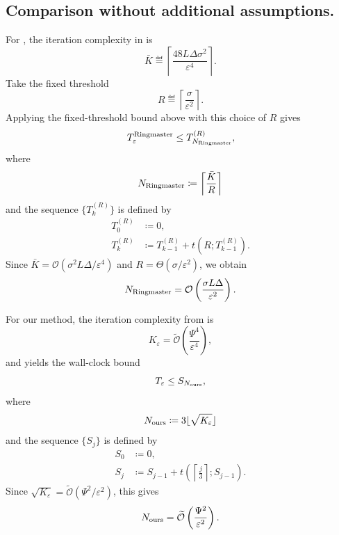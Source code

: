 \documentclass{article}
\begin{document}
\subsection{Comparison without additional assumptions.}
For \ringmaster, the iteration complexity in \citet{maranjyan2025ringmaster} is
\begin{equation*}
    \bar{K} \eqdef \left\lceil\frac{48 L \Delta \sigma^2}{\varepsilon^4}\right\rceil .
\end{equation*}
Take the fixed threshold
\begin{equation*}
    R \eqdef \left\lceil \frac{\sigma}{\varepsilon^2} \right\rceil .
\end{equation*}
Applying the fixed-threshold bound above with this choice of $R$ gives
\begin{equation*}
    T_{\varepsilon}^{\rm Ringmaster}
    \le
    T^{(R)}_{N_{\rm Ringmaster}},
\end{equation*}
where
\begin{equation*}
    N_{\rm Ringmaster} \coloneqq \left\lceil \frac{\bar{K}}{R} \right\rceil
\end{equation*}
and the sequence $\{T^{(R)}_k\}$ is defined by
\begin{align*}
    T^{(R)}_0 &\coloneqq 0, \\
    T^{(R)}_k &\coloneqq T^{(R)}_{k-1} + t(R;T^{(R)}_{k-1}).
\end{align*}
Since $\bar{K} = \mathcal{O}(\sigma^2 L \Delta/\varepsilon^4)$ and $R = \Theta(\sigma/\varepsilon^2)$, we obtain
\begin{equation*}
    N_{\rm Ringmaster}
    =
    \mathcal{O}\left(\frac{\sigma L\Delta}{\varepsilon^2}\right).
\end{equation*}

For our method, the iteration complexity from  is
\begin{equation*}
    K_{\varepsilon} = \widetilde{\mathcal{O}}\left(\frac{\Psi^4}{\varepsilon^4}\right),
\end{equation*}
and  yields the wall-clock bound
\begin{equation*}
    T_{\varepsilon}
    \le
    S_{N_{\rm ours}},
\end{equation*}
where
\begin{equation*}
    N_{\rm ours} \coloneqq 3\lfloor \sqrt{K_{\varepsilon}} \rfloor
\end{equation*}
and the sequence $\{S_j\}$ is defined by
\begin{align*}
    S_0 &\coloneqq 0, \\
    S_j &\coloneqq S_{j-1} + t\!\left(\left\lceil \frac{j}{3} \right\rceil; S_{j-1}\right).
\end{align*}
Since $\sqrt{K_{\varepsilon}} = \widetilde{\mathcal{O}}(\Psi^2/\varepsilon^2)$, this gives
\begin{equation*}
    N_{\rm ours}
    =
    \widetilde{\mathcal{O}}\left(\frac{\Psi^2}{\varepsilon^2}\right).
\end{equation*}
\end{document}
